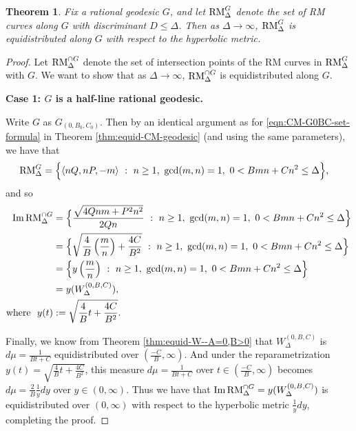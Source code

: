 \documentclass[11pt,letterpaper,reqno]{amsart}
\newtheorem{theorem}{Theorem}[section]
\numberwithin{equation}{section}
\numberwithin{figure}{section}
\numberwithin{table}{section}
\newcommand{\lrp}[1]{\left(#1\right)}
\newcommand{\RM}{\textnormal{RM}}
\begin{document}








{
\renewcommand{\thetheorem}{\ref{thm:equid-RM-geodesic}}
\begin{theorem} 
    Fix a rational geodesic $G$, and let 
    $\RM^{G}_{\Delta}$ denote the set of RM curves along $G$ with discriminant $D \le \Delta$. 
    Then as $\Delta \to \infty$, $\RM^{G}_{\Delta}$ is equidistributed along $G$ with respect to the hyperbolic metric.
\end{theorem}
\addtocounter{theorem}{-1}
}
\begin{proof}  Let $\RM^{\cap G}_{\Delta}$ denote the set of intersection points of the RM curves in $\RM^{G}_{\Delta}$ with $G$. We want to show that as $\Delta\to\infty$, $\RM^{\cap G}_{\Delta}$ is equidistributed along $G$.

\noindent\textbf{Case 1: $G$ is a half-line rational geodesic.}

Write $G$ as $G_{(0,B_0,C_0)}$. Then by an identical argument as for \eqref{eqn:CM-G0BC-set-formula} in Theorem \ref{thm:equid-CM-geodesic} (and using the same parameters), we have that
\begin{align}
    \RM^{G}_{\Delta} 
    &= \Big\{  \langle nQ,nP,-m \rangle  ~:~ n \ge 1,~ \gcd(m,n)=1,~  0 < B mn + C n^2 \le \Delta
    \Big\},
\end{align}
and so
\begin{align}
    \mathrm{Im}\,\RM^{\cap G}_{\Delta} 
    &= \Big\{  \frac{\sqrt{4Qnm +P^2n^2}}{2Qn}  ~:~ n \ge 1,~ \gcd(m,n)=1,~  0 < B mn + C n^2 \le \Delta
    \Big\} \\
    &= \Big\{  \sqrt{\frac{4}{B} \lrp{\frac mn} + \frac{4C}{B^2}}  ~:~ n \ge 1,~ \gcd(m,n)=1,~  0 < B mn + C n^2 \le \Delta
    \Big\} \\
    &=  \Big\{  y\lrp{\frac mn}  ~:~ n \ge 1,~ \gcd(m,n)=1,~  0 < B mn + C n^2 \le \Delta
    \Big\} \\
    &= y(W_{\Delta}^{(0,B,C)}), \\
    \text{where }\ y(t) 
    &:= \sqrt{\frac{4}{B} t + \frac{4C}{B^2}}.
\end{align}

Finally, we know from Theorem \ref{thm:equid-W--A=0,B>0} that $W_{\Delta}^{(0,B,C)}$ is $d\mu = \frac{1}{Bt+C}$ equidistributed over $(\frac{-C}{B},\infty)$. And under the reparametrization 
$y(t) = \sqrt{\frac{4}{B} t + \frac{4C}{B^2}}$, this measure $d\mu = \frac{1}{Bt+C}$ over $t \in (\frac{-C}{B},\infty)$ becomes $d\mu = \frac{2}{B} \frac{1}{y} dy$ over $y \in (0,\infty)$. Thus we have that $\mathrm{Im}\,\RM^{\cap G}_{\Delta} = y(W_{\Delta}^{(0,B,C)})$ is equidistributed over $(0,\infty)$ with respect to the hyperbolic metric $\frac{1}{y} dy$, completing the proof.


\end{proof}
\end{document}
